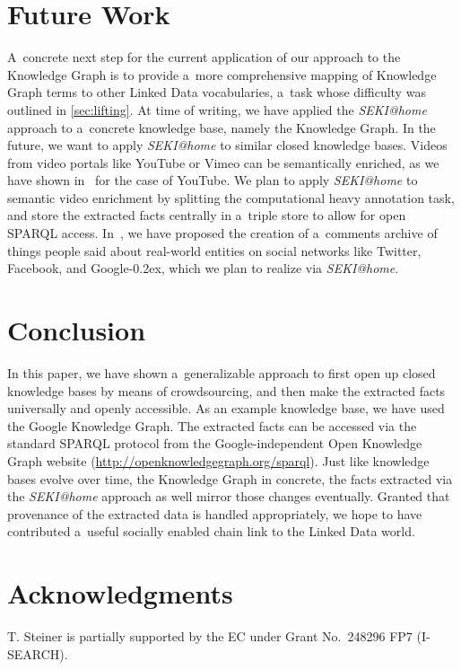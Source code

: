 \documentclass[runningheads,a4paper]{llncs}
\newcommand{\googleplus}{Google\nolinebreak\hspace{0em}\raisebox{.28ex}{\tiny\bf +}\kern-0.2ex\xspace}
\newcommand{\googleplus}{Google\nolinebreak\hspace{0em}\raisebox{.28ex}{\tiny\bf +}\kern-0.2ex\xspace}
\begin{document}
\section{Future Work} \label{sec:future-work}
A~concrete next step for the current application
of our approach to the Knowledge Graph is
to provide a~more comprehensive mapping
of Knowledge Graph terms to other Linked Data vocabularies,
a~task whose difficulty was outlined in \autoref{sec:lifting}.
At time of writing, we have applied the \emph{SEKI@home} approach
to a~concrete knowledge base, namely the Knowledge Graph.
In the future, we want to apply \emph{SEKI@home} to
similar closed knowledge bases.
Videos from video portals like YouTube or Vimeo can be semantically enriched,
as we have shown in~\cite{steiner2010} for the case of YouTube.
We plan to apply \emph{SEKI@home} to semantic video enrichment by splitting
the computational heavy annotation task,
and store the extracted facts centrally in a~triple store
to allow for open SPARQL access.
In~\cite{steiner2012}, we have proposed the creation of
a~comments archive of things people said about real-world entities
on social networks like Twitter, Facebook, and \googleplus,
which we plan to realize via \emph{SEKI@home}.

\section{Conclusion} \label{sec:conclusion}
In this paper, we have shown a~generalizable approach
to first open up closed knowledge bases by means of crowdsourcing,
and then make the extracted facts universally and openly accessible.
As an example knowledge base, we have used the Google Knowledge Graph.
The extracted facts can be accessed via the standard SPARQL protocol
from the Google-independent Open Knowledge Graph website
(\url{http://openknowledgegraph.org/sparql}).
Just like knowledge bases evolve over time, the Knowledge Graph in concrete,
the facts extracted via the \emph{SEKI@home} approach as well
mirror those changes eventually.
Granted that provenance of the extracted data is handled appropriately,
we hope to have contributed a~useful socially enabled chain link
to the Linked Data world.

\section*{Acknowledgments}
\small
T. Steiner is partially supported by the EC
under Grant No.~248296 FP7 (\mbox{I-SEARCH}).



\end{document}

